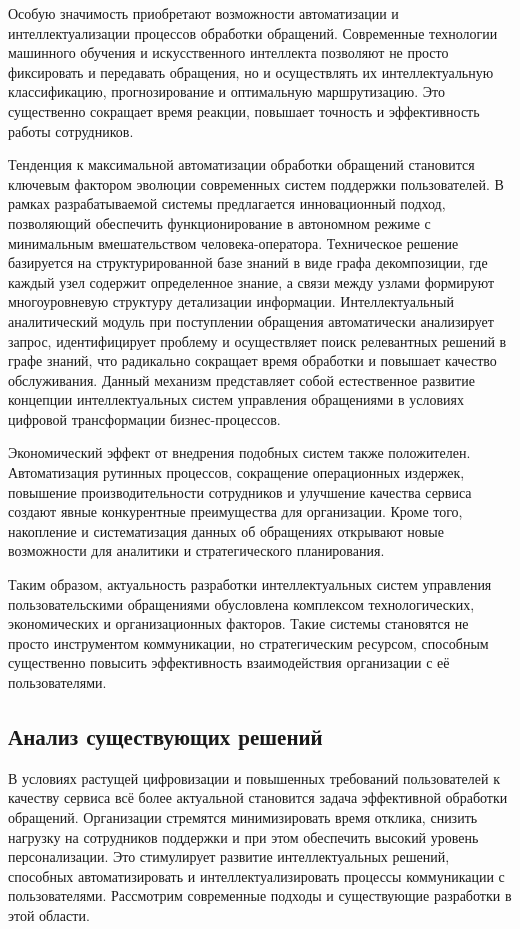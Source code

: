 Особую значимость приобретают возможности автоматизации и интеллектуализации процессов обработки обращений. Современные технологии машинного обучения и искусственного интеллекта позволяют не просто фиксировать и передавать обращения, но и осуществлять их интеллектуальную классификацию, прогнозирование и оптимальную маршрутизацию. Это существенно сокращает время реакции, повышает точность и эффективность работы сотрудников.

Тенденция к максимальной автоматизации обработки обращений становится ключевым фактором эволюции современных систем поддержки пользователей. В рамках разрабатываемой системы предлагается инновационный подход, позволяющий обеспечить функционирование в автономном режиме с минимальным вмешательством человека-оператора. Техническое решение базируется на структурированной базе знаний в виде графа декомпозиции, где каждый узел содержит определенное знание, а связи между узлами формируют многоуровневую структуру детализации информации. Интеллектуальный аналитический модуль при поступлении обращения автоматически анализирует запрос, идентифицирует проблему и осуществляет поиск релевантных решений в графе знаний, что радикально сокращает время обработки и повышает качество обслуживания. Данный механизм представляет собой естественное развитие концепции интеллектуальных систем управления обращениями в условиях цифровой трансформации бизнес-процессов.

Экономический эффект от внедрения подобных систем также положителен. Автоматизация рутинных процессов, сокращение операционных издержек, повышение производительности сотрудников и улучшение качества сервиса создают явные конкурентные преимущества для организации. Кроме того, накопление и систематизация данных об обращениях открывают новые возможности для аналитики и стратегического планирования.

Таким образом, актуальность разработки интеллектуальных систем управления пользовательскими обращениями обусловлена комплексом технологических, экономических и организационных факторов. Такие системы становятся не просто инструментом коммуникации, но стратегическим ресурсом, способным существенно повысить эффективность взаимодействия организации с её пользователями.

\subsection{Анализ существующих решений}

В условиях растущей цифровизации и повышенных требований пользователей к качеству сервиса всё более актуальной становится задача эффективной обработки обращений. Организации стремятся минимизировать время отклика, снизить нагрузку на сотрудников поддержки и при этом обеспечить высокий уровень персонализации. Это стимулирует развитие интеллектуальных решений, способных автоматизировать и интеллектуализировать процессы коммуникации с пользователями. Рассмотрим современные подходы и существующие разработки в этой области.

